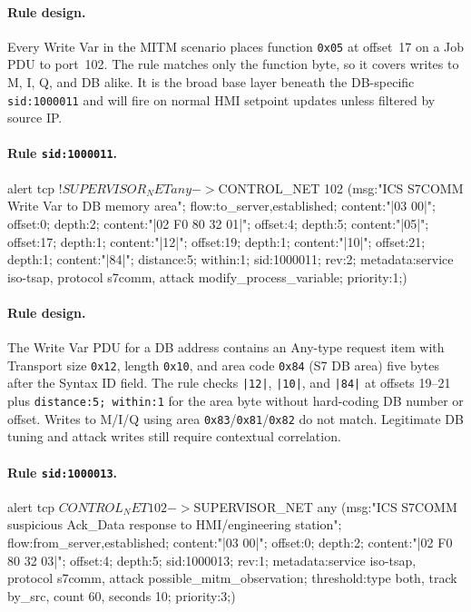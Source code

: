 \documentclass[../main.tex]{subfiles}
\begin{document}
\paragraph{Rule design.}
Every Write Var in the MITM scenario places function \texttt{0x05} at offset~17 on a Job PDU to port~102. The rule matches only the function byte, so it covers writes to M, I, Q, and DB alike. It is the broad base layer beneath the DB-specific \texttt{sid:1000011} and will fire on normal HMI setpoint updates unless filtered by source IP.

\paragraph{Rule \texttt{sid:1000011}.}
\begin{packetdump}
alert tcp !$SUPERVISOR_NET any -> $CONTROL_NET 102 (msg:"ICS S7COMM Write Var to DB memory area";
  flow:to_server,established; content:"|03 00|"; offset:0; depth:2;
  content:"|02 F0 80 32 01|"; offset:4; depth:5; content:"|05|";
  offset:17; depth:1; content:"|12|"; offset:19; depth:1;
  content:"|10|"; offset:21; depth:1; content:"|84|";
  distance:5; within:1; sid:1000011; rev:2;
  metadata:service iso-tsap, protocol s7comm, attack modify_process_variable;
  priority:1;)
\end{packetdump}

\paragraph{Rule design.}
The Write Var PDU for a DB address contains an Any-type request item with Transport size \texttt{0x12}, length \texttt{0x10}, and area code \texttt{0x84} (S7 DB area) five bytes after the Syntax ID field. The rule checks \texttt{|12|}, \texttt{|10|}, and \texttt{|84|} at offsets 19--21 plus \texttt{distance:5; within:1} for the area byte without hard-coding DB number or offset. Writes to M/I/Q using area \texttt{0x83}/\texttt{0x81}/\texttt{0x82} do not match. Legitimate DB tuning and attack writes still require contextual correlation.

\paragraph{Rule \texttt{sid:1000013}.}
\begin{packetdump}
alert tcp $CONTROL_NET 102 -> $SUPERVISOR_NET any (msg:"ICS S7COMM suspicious Ack_Data response
  to HMI/engineering station"; flow:from_server,established;
  content:"|03 00|"; offset:0; depth:2; content:"|02 F0 80 32 03|";
  offset:4; depth:5; sid:1000013; rev:1;
  metadata:service iso-tsap, protocol s7comm, attack possible_mitm_observation;
  threshold:type both, track by_src, count 60, seconds 10; priority:3;)
\end{packetdump}
\end{document}

